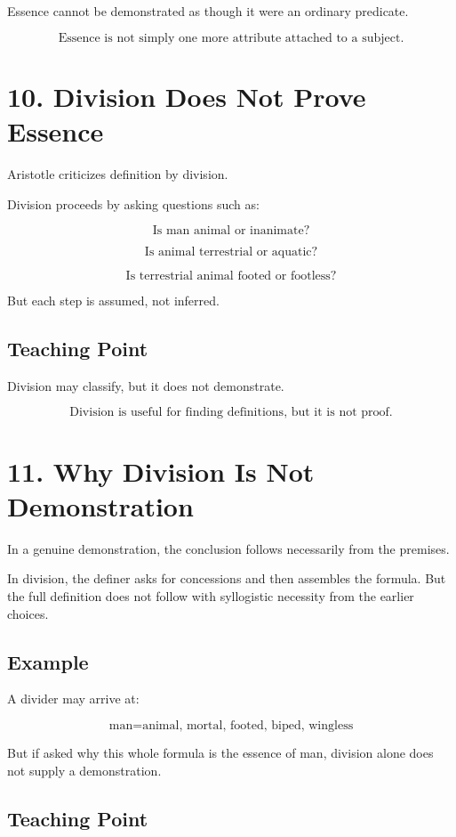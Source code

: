 \documentclass[12pt]{article}
\begin{document}
Essence cannot be demonstrated as though it were an ordinary predicate.

\[
\boxed{
\text{Essence is not simply one more attribute attached to a subject.}
}
\]

\section*{10. Division Does Not Prove Essence}

Aristotle criticizes definition by division.

Division proceeds by asking questions such as:

\[
\text{Is man animal or inanimate?}
\]

\[
\text{Is animal terrestrial or aquatic?}
\]

\[
\text{Is terrestrial animal footed or footless?}
\]

But each step is assumed, not inferred.

\subsection*{Teaching Point}

Division may classify, but it does not demonstrate.

\[
\boxed{
\text{Division is useful for finding definitions, but it is not proof.}
}
\]

\section*{11. Why Division Is Not Demonstration}

In a genuine demonstration, the conclusion follows necessarily from the
premises.

In division, the definer asks for concessions and then assembles the formula.
But the full definition does not follow with syllogistic necessity from the
earlier choices.

\subsection*{Example}

A divider may arrive at:

\[
\text{man} = \text{animal, mortal, footed, biped, wingless}
\]

But if asked why this whole formula is the essence of man, division alone does
not supply a demonstration.

\subsection*{Teaching Point}
\end{document}

